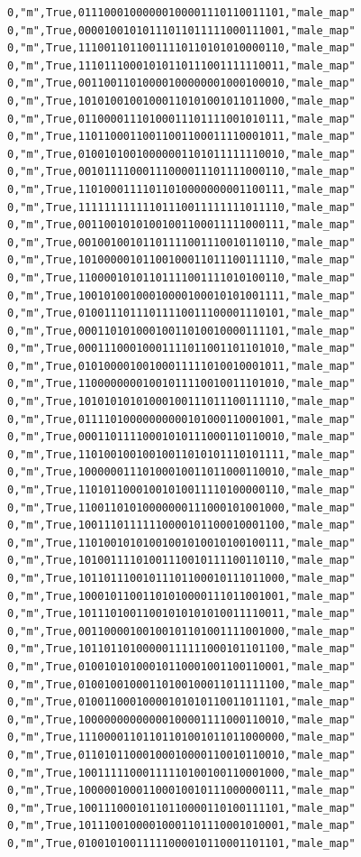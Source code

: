 \documentclass[authoryearcitations]{UoYCSproject}
\begin{document}
\begin{framed}
\begin{verbatim}
0,"m",True,01110001000000100001110110011101,"male_map"
0,"m",True,00001001010111011011111000111001,"male_map"
0,"m",True,11100110110011110110101010000110,"male_map"
0,"m",True,11101110001010110111001111110011,"male_map"
0,"m",True,00110011010000100000001000100010,"male_map"
0,"m",True,10101001001000110101001011011000,"male_map"
0,"m",True,01100001110100011101111001010111,"male_map"
0,"m",True,11011000110011001100011110001011,"male_map"
0,"m",True,01001010010000001101011111110010,"male_map"
0,"m",True,00101111000111000011101111000110,"male_map"
0,"m",True,11010001111011010000000001100111,"male_map"
0,"m",True,11111111111101110011111111011110,"male_map"
0,"m",True,00110010101001001100011111000111,"male_map"
0,"m",True,00100100101101111001110010110110,"male_map"
0,"m",True,10100000101100100011011100111110,"male_map"
0,"m",True,11000010101101111001111010100110,"male_map"
0,"m",True,10010100100010000100010101001111,"male_map"
0,"m",True,01001110111011110011100001110101,"male_map"
0,"m",True,00011010100010011010010000111101,"male_map"
0,"m",True,00011100010001111011001101101010,"male_map"
0,"m",True,01010000100100011111010010001011,"male_map"
0,"m",True,11000000001001011110010011101010,"male_map"
0,"m",True,10101010101000100111011100111110,"male_map"
0,"m",True,01111010000000000101000110001001,"male_map"
0,"m",True,00011011110001010111000110110010,"male_map"
0,"m",True,11010010010010011010101110101111,"male_map"
0,"m",True,10000001110100010011011000110010,"male_map"
0,"m",True,11010110001001010011110100000110,"male_map"
0,"m",True,11001101010000000111000101001000,"male_map"
0,"m",True,10011101111110000101100010001100,"male_map"
0,"m",True,11010010101001001010010100100111,"male_map"
0,"m",True,10100111101001110010111100110110,"male_map"
0,"m",True,10110111001011101100010111011000,"male_map"
0,"m",True,10001011001101010000111011001001,"male_map"
0,"m",True,10111010011001010101010011110011,"male_map"
0,"m",True,00110000100100101101001111001000,"male_map"
0,"m",True,10110110100000111111000101101100,"male_map"
0,"m",True,01001010100010110001001100110001,"male_map"
0,"m",True,01001001000110100100011011111100,"male_map"
0,"m",True,01001100010000101010110011011101,"male_map"
0,"m",True,10000000000000100001111000110010,"male_map"
0,"m",True,11100001101101101001011011000000,"male_map"
0,"m",True,01101011000100010000110010110010,"male_map"
0,"m",True,10011111000111110100100110001000,"male_map"
0,"m",True,10000010001100010010111000000111,"male_map"
0,"m",True,10011100010110110000110100111101,"male_map"
0,"m",True,10111001000010001101110001010001,"male_map"
0,"m",True,01001010011111000010110001101101,"male_map"

\end{verbatim}
\end{framed}
\end{document}
